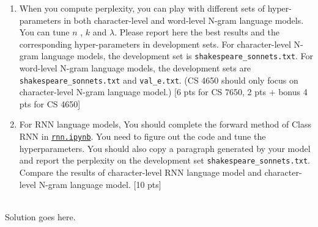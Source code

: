 \begin{enumerate}
    \item When you compute perplexity, you can play with different sets of hyper-parameters in both character-level and word-level N-gram language models. You can tune $n$ , $k$ and $\lambda$. Please report here the best results and the corresponding hyper-parameters in development sets. For character-level N-gram language models, the development set is \texttt{shakespeare\_sonnets.txt}. For word-level N-gram language models, the development sets are \texttt{shakespeare\_sonnets.txt} and \texttt{val\_e.txt}. (CS 4650 should only focus on character-level N-gram language model.) [6 pts for CS 7650, 2 pts + bonus 4 pts for CS 4650]
    
    \item For RNN language models, You should complete the forward method of Class RNN in  \href{https://www.cc.gatech.edu/classes/AY2020/cs7650_spring/hw3/lm/rnn.zip} {\texttt{rnn.ipynb}}. You need to figure out the code and tune the hyperparameters. You should also copy a paragraph generated by your model and report the perplexity on the development set \texttt{shakespeare\_sonnets.txt}. Compare the results of character-level RNN language model and character-level N-gram language model. [10 pts]

\end{enumerate}


\begin{solution} \ \\
Solution goes here.
\end{solution}
